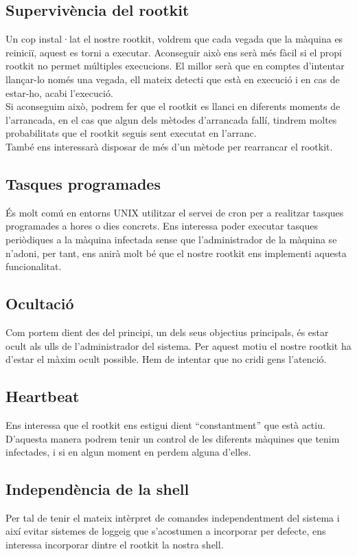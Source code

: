 \subsection{Supervivència del rootkit}
Un cop instal·lat el nostre rootkit, voldrem que cada vegada que la màquina es reiniciï, aquest es torni a executar. 
Aconseguir això ens serà més fàcil si el propi rootkit no permet múltiples execucions. El millor serà que en comptes
d'intentar llançar-lo només una vegada, ell mateix detecti que està en execució i en cas de estar-ho, acabi l'execució. \\

Si aconseguim això, podrem fer que el rootkit es llanci en diferents moments de l'arrancada, en el cas que algun dels mètodes
d'arrancada fallí, tindrem moltes probabilitats que el rootkit seguis sent executat en l'arranc. \\

També ens interessarà disposar de més d'un mètode per rearrancar el rootkit.

\subsection{Tasques programades}
És molt comú en entorns UNIX utilitzar el servei de cron per a realitzar tasques programades a hores o dies concrets. Ens interessa
poder executar tasques periòdiques a la màquina infectada sense que l'administrador de la màquina se n'adoni, per tant, ens anirà molt bé que 
el nostre rootkit ens implementi aquesta funcionalitat.

\subsection{Ocultació}
Com portem dient des del principi, un dels seus objectius principals, és estar ocult als ulls de l'administrador del sistema. Per aquest motiu el 
nostre rootkit ha d'estar el màxim ocult possible. Hem de intentar que no cridi gens l'atenció.

\subsection{Heartbeat}
Ens interessa que el rootkit ens estigui dient ``constantment'' que està actiu. D'aquesta manera podrem tenir un control de les diferents
màquines que tenim infectades, i si en algun moment en perdem alguna d'elles.

\subsection{Independència de la shell}
Per tal de tenir el mateix intèrpret de comandes independentment del sistema i així evitar sistemes de loggeig que s'acostumen a 
incorporar per defecte, ens interessa incorporar dintre el rootkit la nostra shell.

